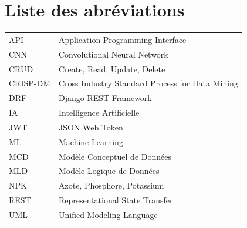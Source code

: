 \documentclass[12pt,a4paper]{report}
\begin{document}
\chapter*{Liste des abréviations}
\begin{longtable}{p{3cm}p{11cm}}
API & Application Programming Interface \\
CNN & Convolutional Neural Network \\
CRUD & Create, Read, Update, Delete \\
CRISP-DM & Cross Industry Standard Process for Data Mining \\
DRF & Django REST Framework \\
IA & Intelligence Artificielle \\
JWT & JSON Web Token \\
ML & Machine Learning \\
MCD & Modèle Conceptuel de Données \\
MLD & Modèle Logique de Données \\
NPK & Azote, Phosphore, Potassium \\
REST & Representational State Transfer \\
UML & Unified Modeling Language \\
\end{longtable}

\tableofcontents
\listoffigures
\listoftables
\clearpage
{}







\printbibliography[title={Bibliographie et webographie}]
\end{document}
